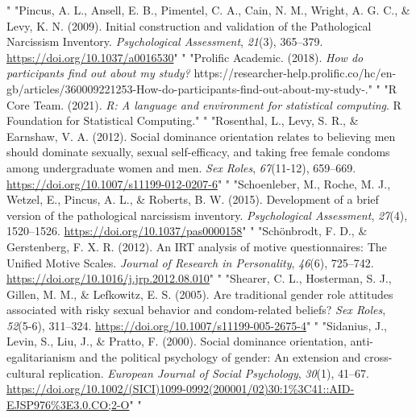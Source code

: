 \documentclass[
"  donotrepeattitle,doc, 12pt, a4paper,floatsintext]{apa7}"
\begin{document}
\begin{CSLReferences}{1}{0}
"\leavevmode{}%
"Pincus, A. L., Ansell, E. B., Pimentel, C. A., Cain, N. M., Wright, A. G. C., \& Levy, K. N. (2009). Initial construction and validation of the {Pathological Narcissism Inventory}. \emph{Psychological Assessment}, \emph{21}(3), 365--379. \url{https://doi.org/10.1037/a0016530}"
"\leavevmode{}%
"Prolific Academic. (2018). \emph{How do participants find out about my study?} https://researcher-help.prolific.co/hc/en-gb/articles/360009221253-How-do-participants-find-out-about-my-study-."
"\leavevmode{}%
"R Core Team. (2021). \emph{R: {A} language and environment for statistical computing}. R Foundation for Statistical Computing."
"\leavevmode{}%
"Rosenthal, L., Levy, S. R., \& Earnshaw, V. A. (2012). Social dominance orientation relates to believing men should dominate sexually, sexual self-efficacy, and taking free female condoms among undergraduate women and men. \emph{Sex Roles}, \emph{67}(11-12), 659--669. \url{https://doi.org/10.1007/s11199-012-0207-6}"
"\leavevmode{}%
"Schoenleber, M., Roche, M. J., Wetzel, E., Pincus, A. L., \& Roberts, B. W. (2015). Development of a brief version of the pathological narcissism inventory. \emph{Psychological Assessment}, \emph{27}(4), 1520--1526. \url{https://doi.org/10.1037/pas0000158}"
"\leavevmode{}%
"Schönbrodt, F. D., \& Gerstenberg, F. X. R. (2012). An {IRT} analysis of motive questionnaires: {The Unified Motive Scales}. \emph{Journal of Research in Personality}, \emph{46}(6), 725--742. \url{https://doi.org/10.1016/j.jrp.2012.08.010}"
"\leavevmode{}%
"Shearer, C. L., Hosterman, S. J., Gillen, M. M., \& Lefkowitz, E. S. (2005). Are traditional gender role attitudes associated with risky sexual behavior and condom-related beliefs? \emph{Sex Roles}, \emph{52}(5-6), 311--324. \url{https://doi.org/10.1007/s11199-005-2675-4}"
"\leavevmode{}%
"Sidanius, J., Levin, S., Liu, J., \& Pratto, F. (2000). Social dominance orientation, anti-egalitarianism and the political psychology of gender: An extension and cross-cultural replication. \emph{European Journal of Social Psychology}, \emph{30}(1), 41--67. \url{https://doi.org/10.1002/(SICI)1099-0992(200001/02)30:1\%3C41::AID-EJSP976\%3E3.0.CO;2-O}"
"\leavevmode{}%

\end{CSLReferences}
\end{document}
